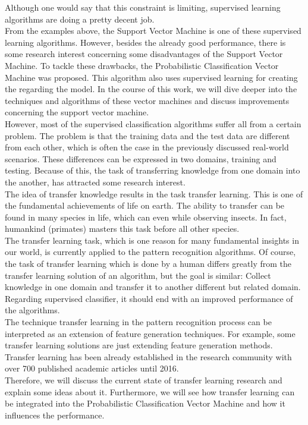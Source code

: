 Although one would say that this constraint is limiting, supervised learning algorithms are doing a pretty decent job.\\
From the examples above, the Support Vector Machine is one of these supervised learning algorithms. 
However, besides the already good performance, there is some research interest concerning some disadvantages of the Support Vector Machine.
To tackle these drawbacks, the Probabilistic Classification Vector Machine was proposed.
This algorithm also uses supervised learning for creating the regarding the model.
In the course of this work, we will dive deeper into the techniques and algorithms of these vector machines and discuss improvements concerning the support vector machine.\\
However, most of the supervised classification algorithms suffer all from a certain problem. 
The problem is that the training data and the test data are different from each other, which is often the case in the previously discussed real-world scenarios.
These differences can be expressed in two domains, training and testing.
Because of this, the task of transferring knowledge from one domain into the another, has attracted some research interest.\\
The idea of transfer knowledge results in the task transfer learning. 
This is one of the fundamental achievements of life on earth.
The ability to transfer can be found in many species in life, which can even while observing insects.
In fact, humankind (primates) masters this task before all other species.\cite{Buchholtz.1982}\\
The transfer learning task, which is one reason for many fundamental insights in our world, is currently applied to the pattern recognition algorithms. 
Of course, the task of transfer learning which is done by a human differs greatly from the transfer learning solution of an algorithm, but the goal is similar:
Collect knowledge in one domain and transfer it to another different but related domain. Regarding supervised classifier, it should end with an improved performance of the algorithms.\\
The technique transfer learning in the pattern recognition process can be interpreted as an extension of feature generation techniques.
For example, some transfer learning solutions are just extending feature generation methods. 
Transfer learning has been already established in the research community with over 700 published academic articles until 2016.\\
Therefore, we will discuss the current state of transfer learning research and explain some ideas about it.
Furthermore, we will see how transfer learning can be integrated into the Probabilistic Classification Vector Machine and how it influences the performance.\\
\cite{Paluszek.2017}\cite{Wu.2008}\cite{Singh.2010}\cite{TrevorHastie.2009}\cite{Theodoridis.2015} \cite{Theodoridis.2008} \cite{Weiss.2016}\cite{Bishop.2009}\cite{Tipping.2001}\cite{Chen.2009}\cite{Pan.2010}\cite{Weiss.2016}\cite{Theodoridis.2008}